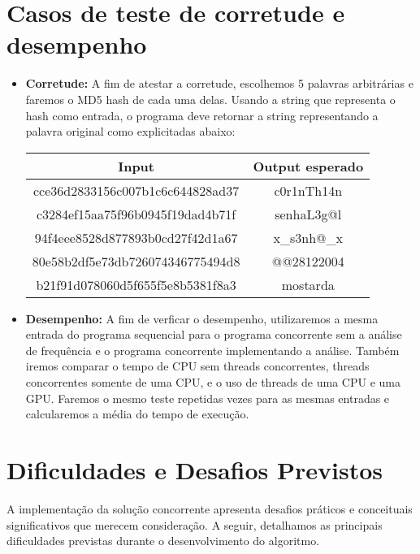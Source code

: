 \documentclass[12pt, a4paper]{article}
\begin{document}
\section{Casos de teste de corretude e desempenho}
\begin{itemize}
    \item \textbf{Corretude:} A fim de atestar a corretude, escolhemos 5 palavras arbitrárias e faremos o MD5 hash de cada uma delas. Usando a string que representa o hash como entrada, o programa deve retornar a string representando a palavra original como explicitadas abaixo:
    \begin{center}
    \begin{tabular}{ |c|c| } 
     \hline
     Input & Output esperado \\
     \hline
     cce36d2833156c007b1c6c644828ad37 & c0r1nTh14n \\
     c3284ef15aa75f96b0945f19dad4b71f & senhaL3g@l \\
     94f4eee8528d877893b0cd27f42d1a67 & x\_s3nh@\_x \\
     80e58b2df5e73db726074346775494d8 & @@28122004 \\
     b21f91d078060d5f655f5e8b5381f8a3 & mostarda  \\
     \hline
    \end{tabular}

    \end{center}
    
    \item \textbf{Desempenho:} A fim de verficar o desempenho, utilizaremos a mesma entrada do programa sequencial para o programa concorrente sem a análise de frequência e o programa concorrente implementando a análise. Também iremos comparar o tempo de CPU sem threads concorrentes, threads concorrentes somente de uma CPU, e o uso de threads de uma CPU e uma GPU. Faremos o mesmo teste repetidas vezes para as mesmas entradas e calcularemos a média do tempo de execução.
\end{itemize}

\section{Dificuldades e Desafios Previstos}

A implementação da solução concorrente apresenta desafios práticos e conceituais significativos que merecem consideração. A seguir, detalhamos as principais dificuldades previstas durante o desenvolvimento do algoritmo.
\end{document}
